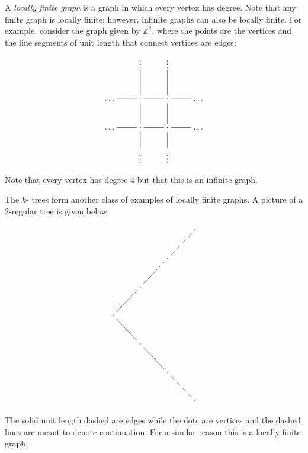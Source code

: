 \documentclass[12pt]{article}
\begin{document}

A \emph{locally finite graph} is a graph in which every vertex has  degree.
Note that any finite graph is locally finite;
however, infinite graphs can also be locally finite.
For example, consider the graph given by $\mathbb{Z}^{2}$,
where the points are the vertices and the line segments of unit length that connect vertices are edges:
\[
\xymatrix{
& \vdots \ar@{-}[d] & \vdots \ar@{-}[d] &  \\
\dots \ar@{-}[r] & \cdot \ar@{-}[r] \ar@{-}[d] & \cdot \ar@{-}[d] \ar@{-}[r] & \dots \\
\dots \ar@{-}[r] & \cdot \ar@{-}[r] \ar@{-}[d] & \cdot \ar@{-}[r] \ar@{-}[d] & \dots \\ & \vdots & \vdots }
\]

Note that every vertex has degree $4$ but that this is an infinite graph.

The $k$- trees
form another class of examples of locally finite graphs.
A picture of a $2$-regular tree is given below

\[
\xymatrix{
& & & \cdot \\
& & \cdot \ar@{--}[ur] &  \\
& \cdot \ar@{-}[ur] & & \\
\cdot \ar@{-}[ur] \ar@{-}[dr] & & & \\
& \cdot \ar@{-}[dr] & & \\
& & \cdot \ar@{--}[dr] & \\
& & & \cdot }
\]

The solid unit length dashed are edges while the dots are vertices and the dashed lines are meant to denote continuation.
For a similar reason this is a locally finite graph.
\end{document}
